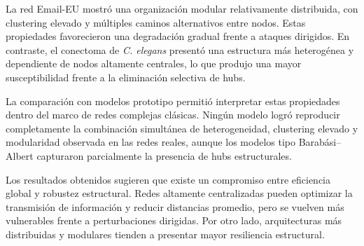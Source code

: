 La red Email-EU mostró una organización modular relativamente distribuida, con clustering elevado y múltiples caminos alternativos entre nodos. Estas propiedades favorecieron una degradación gradual frente a ataques dirigidos. En contraste, el conectoma de \textit{C. elegans} presentó una estructura más heterogénea y dependiente de nodos altamente centrales, lo que produjo una mayor susceptibilidad frente a la eliminación selectiva de hubs.

La comparación con modelos prototipo permitió interpretar estas propiedades dentro del marco de redes complejas clásicas. Ningún modelo logró reproducir completamente la combinación simultánea de heterogeneidad, clustering elevado y modularidad observada en las redes reales, aunque los modelos tipo Barabási--Albert capturaron parcialmente la presencia de hubs estructurales.

Los resultados obtenidos sugieren que existe un compromiso entre eficiencia global y robustez estructural. Redes altamente centralizadas pueden optimizar la transmisión de información y reducir distancias promedio, pero se vuelven más vulnerables frente a perturbaciones dirigidas. Por otro lado, arquitecturas más distribuidas y modulares tienden a presentar mayor resiliencia estructural.
